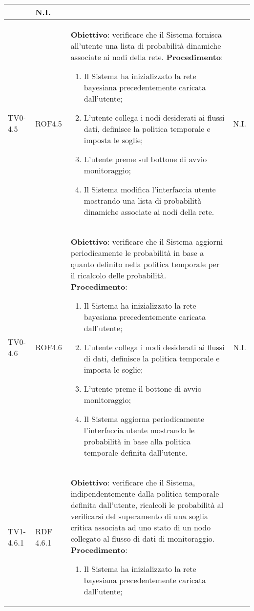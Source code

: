 \begin{longtable}{|C{.15\textwidth}|C{.13\textwidth}|m{.52\textwidth}|C{.08\textwidth}|}
	& N.I. \\
\hline
{} TV0-4.5 & ROF4.5 &
	\textbf{Obiettivo}: verificare che il Sistema fornisca all'utente una lista di probabilità dinamiche associate ai nodi della rete. \newline
	\textbf{Procedimento}:
	\begin{enumerate}
		\item Il Sistema ha inizializzato la rete bayesiana precedentemente caricata dall'utente;
		\item L'utente collega i nodi desiderati ai flussi dati, definisce la politica temporale e imposta le soglie;
		\item L'utente preme sul bottone di avvio monitoraggio;
		\item Il Sistema modifica l'interfaccia utente mostrando una lista di probabilità dinamiche associate ai nodi della rete.
	\end{enumerate}
	& N.I. \\
\hline
TV0-4.6 & ROF4.6 &
	\textbf{Obiettivo}: verificare che il Sistema aggiorni periodicamente le probabilità in base a quanto definito nella politica temporale per il ricalcolo delle probabilità. \newline
	\textbf{Procedimento}:
	\begin{enumerate}
		\item Il Sistema ha inizializzato la rete bayesiana precedentemente caricata dall'utente;
		\item L'utente collega i nodi desiderati ai flussi di dati, definisce la politica temporale e imposta le soglie;
		\item L'utente preme il bottone di avvio monitoraggio;
		\item Il Sistema aggiorna periodicamente l'interfaccia utente mostrando le probabilità in base alla politica temporale definita dall'utente.
	\end{enumerate}
	& N.I. \\
\hline
{} TV1-4.6.1 & RDF 4.6.1 &
	\textbf{Obiettivo}: verificare che il Sistema, indipendentemente dalla politica temporale definita dall'utente, ricalcoli le probabilità al verificarsi del superamento di una soglia critica associata ad uno stato di un nodo collegato al flusso di dati di monitoraggio. \newline
	\textbf{Procedimento}:
	\begin{enumerate}
		\item Il Sistema ha inizializzato la rete bayesiana precedentemente caricata dall'utente;

\end{enumerate}
\end{longtable}
